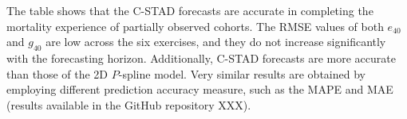 \documentclass[11pt, a4paper]{article}
\begin{document}
%		
%		
%		

The table shows that the C-STAD forecasts are accurate in completing the mortality experience of partially observed cohorts. The RMSE values of both $e_{40}$ and $g_{40}$  are low across the six exercises, and they do not increase significantly with the forecasting horizon. Additionally, C-STAD forecasts are more accurate than those of the 2D $P$-spline model. Very similar results are obtained by employing different prediction accuracy measure, such as the MAPE and MAE (results available in the GitHub repository XXX). \par

\end{document}
